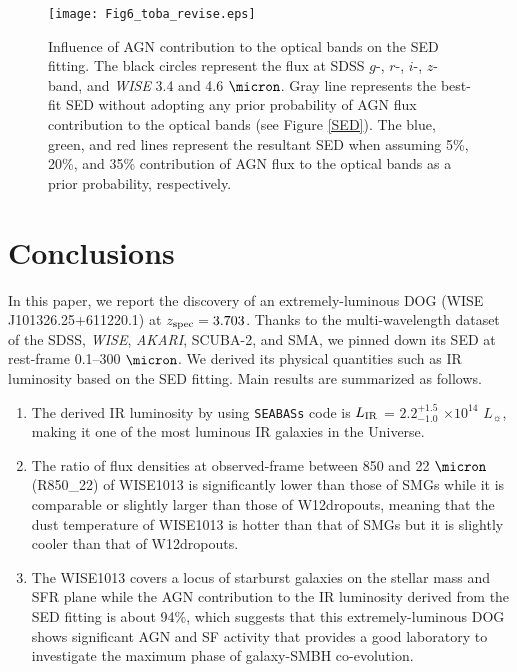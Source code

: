 \documentclass[twocolumn]{aastex6}
\begin{document}
   \begin{figure}
   \centering
   \texttt{[image: Fig6\_toba\_revise.eps]}
   \caption{Influence of AGN contribution to the optical bands on the SED fitting. The black circles represent the flux at SDSS $g$-, $r$-, $i$-, $z$-band, and {\it WISE} 3.4 and 4.6 $\micron$. Gray line represents the best-fit SED without adopting any prior probability of AGN flux contribution to the optical bands (see Figure \ref{SED}). The blue, green, and red lines represent the resultant SED when assuming 5\%, 20\%, and 35\% contribution of AGN flux to the optical bands as a prior probability, respectively.} 
   \label{M}
   \end{figure}
   
   

\section{Conclusions}
In this paper, we report the discovery of an extremely-luminous DOG (WISE J101326.25+611220.1) at $z_{\rm spec} = 3.703$.
Thanks to the multi-wavelength dataset of the SDSS, {\it WISE}, {\it AKARI}, SCUBA-2, and SMA, we pinned down its SED at rest-frame 0.1--300 $\micron$. 
We derived its physical quantities such as IR luminosity based on the SED fitting. 
Main results are summarized as follows.
\begin{enumerate}
\item The derived IR luminosity by using {\tt SEABASs} code is $L_{\rm IR}$ = $2.2^{+1.5}_{-1.0}$ $\times 10^{14}$ $L_{\sun}$, making it one of the most luminous IR galaxies in the Universe.
\item The ratio of flux densities at observed-frame between 850 and 22 $\micron$ (R850\_22) of WISE1013 is significantly lower than those of SMGs while it is comparable or slightly larger than those of W12dropouts, meaning that the dust temperature of WISE1013 is hotter than that of SMGs but it is slightly cooler than that of W12dropouts.
\item The WISE1013 covers a locus of starburst galaxies on the stellar mass and SFR plane while the AGN contribution to the IR luminosity derived from the SED fitting is about 94\%, which suggests that this extremely-luminous DOG shows significant AGN and SF activity that provides a good laboratory to investigate the maximum phase of galaxy-SMBH co-evolution.
\end{enumerate}
 
\end{document}
